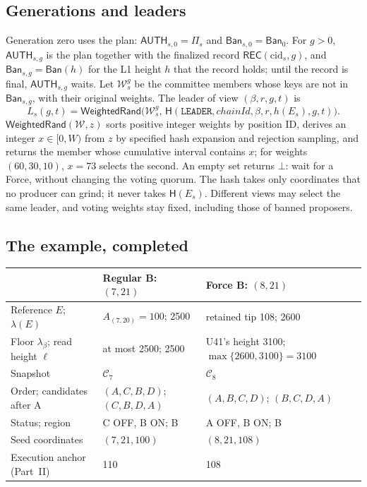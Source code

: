 \documentclass[11pt,a4paper]{article}
\newcommand{\Hash}{\mathsf H}
\newcommand{\tagg}[1]{\mathsf{#1}}
\newcommand{\cfg}{\mathcal C}
\newcommand{\Ban}{\mathsf{Ban}}
\newcommand{\cid}{\mathrm{cid}}
\begin{document}
\subsection{Generations and leaders}
\label{sec:leaders}
Generation zero uses the plan: $\tagg{AUTH}_{s,0}=\Pi_s$ and
$\Ban_{s,0}=\Ban_0$. For $g>0$, $\tagg{AUTH}_{s,g}$ is the plan together
with the finalized record $\tagg{REC}(\cid_s,g)$, and
$\Ban_{s,g}=\Ban(h)$ for the L1 height $h$ that the record holds; until
the record is final, $\tagg{AUTH}_{s,g}$ waits. Let $\mathcal W^g_s$ be the committee members
whose keys are not in $\Ban_{s,g}$, with their original weights. The
leader of view $(\beta,r,g,t)$ is
\begin{equation}\label{eq:leader}
 L_s(g,t)=\tagg{WeightedRand}\bigl(\mathcal W^g_s,\,
 \Hash(\texttt{LEADER},\mathit{chainId},\beta,r,h(E_s),g,t)\bigr).
\end{equation}
$\tagg{WeightedRand}(\mathcal W,z)$ sorts positive integer weights by
position ID, derives an integer $x\in[0,W)$ from $z$ by specified hash
expansion and rejection sampling, and returns the member whose cumulative
interval contains $x$; for weights $(60,30,10)$, $x=73$ selects the
second. An empty set returns $\bot$: wait for a Force, without changing
the voting quorum. The hash takes only coordinates that no producer can
grind; it never takes $\Hash(E_s)$. Different views may select the same
leader, and voting weights stay fixed, including those of banned
proposers.

\subsection{The example, completed}
\label{sec:example}
\begin{tabularx}{\linewidth}{@{}>{\raggedright\arraybackslash}p{.27\linewidth}YY@{}}\toprule
 & Regular B: $(7,21)$ & Force B: $(8,21)$\\\midrule
Reference $E$; $\lambda(E)$ & $A_{(7,20)}=100$; 2500 & retained tip 108; 2600\\
Floor $\lambda_\beta$; read height $\ell$ & at most 2500; 2500 & U41's height 3100; $\max\{2600,3100\}=3100$\\
Snapshot & $\cfg_7$ & $\cfg_8$\\
Order; candidates after A & $(A,C,B,D)$; $(C,B,D,A)$ & $(A,B,C,D)$; $(B,C,D,A)$\\
Status; region & C OFF, B ON; B & A OFF, B ON; B\\
Seed coordinates & $(7,21,100)$ & $(8,21,108)$\\
Execution anchor (Part~II) & 110 & 108\\\bottomrule
\end{tabularx}
\end{document}
